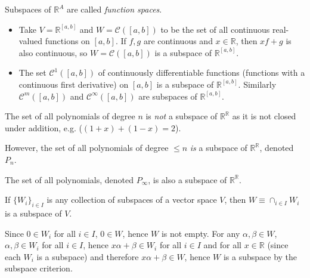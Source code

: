\documentclass[12pt,letterpaper,reqno]{article}
\numberwithin{equation}{section}
\newcommand{\ti}[1]{\textit{#1}}
\begin{document}
\begin{example}
	Subspaces of $\mathbb{R}^A$ are called \emph{function spaces}.
	\begin{itemize}
	\item Take $V=\mathbb{R}^{[a,b]}$ and $W=\mathscr{C}([a,b])$ to be the set of all continuous real-valued functions on $[a,b]$. If $f,g$ are continuous and $x \in \mathbb{R}$, then $xf+g$ is also continuous, so $W=\mathscr{C}([a,b])$ is a subspace of $\mathbb{R}^{[a,b]}$.
	\item The set $\mathscr{C}^1([a,b])$ of continuously differentiable functions (functions with a continuous first derivative) on $[a,b]$ is a subspace of $\mathbb{R}^{[a,b]}$. Similarly $\mathscr{C}^m([a,b])$ and $\mathscr{C}^\infty([a,b])$ are subspaces of $\mathbb{R}^{[a,b]}$.
\end{itemize}
\end{example}

\begin{example}[Polynomials]
	The set of all polynomials of degree $n$ is \emph{not} a subspace of $\mathbb{R}^\mathbb{R}$ as it is not closed under addition, e.g. ($(1+x)+(1-x)=2$). 
	
However, the set of all polynomials of degree $\leq n$ \ti{is} a subspace of $\mathbb{R}^\mathbb{R}$, denoted $P_n$. 

The set of all polynomials, denoted $P_\infty$, is also a subspace of $\mathbb{R}^\mathbb{R}$.
\end{example}

\begin{thm}\label{thm:intersection_of_subspaces}
	If $\{W_i\}_{i \in I}$ is any collection of subspaces of a vector space $V$, then $W\equiv \cap_{i \in I}W_i$ is a subspace of $V$.
\end{thm}

\begin{pf}
	Since $0 \in W_i$ for all $i\in I$, $0 \in W$, hence $W$ is not empty. For any $\alpha,\beta \in W$, $\alpha,\beta \in W_i$ for all $i \in I$, hence $x\alpha+\beta \in W_i$ for all $i \in I$ and for all $x\in \mathbb{R}$ (since each $W_i$ is a subspace) and therefore $x\alpha+\beta \in W$, hence $W$ is a subspace by the subspace criterion.
\end{pf}
\end{document}
